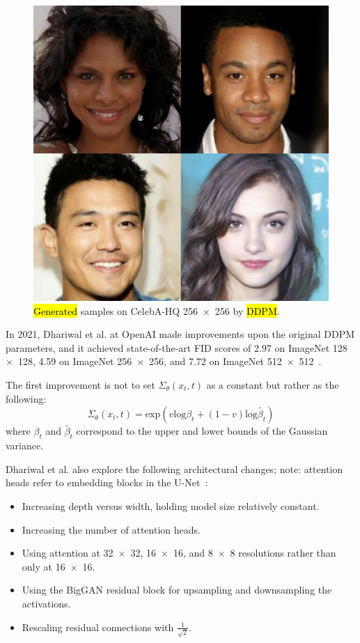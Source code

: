 \documentclass[technologies,article,accept,pdftex,moreauthors]{Definitions/mdpi}
\begin{document}
\begin{figure}[H]
    \includegraphics[width=.95\columnwidth]{celeb.png}
    \caption{\label{fig:DDPMCeleb}\hl{Generated} %
 samples on CelebA-HQ 256~$\times$~256 by \hl{DDPM}.}
\end{figure}



In 2021, Dhariwal et al. at OpenAI made improvements upon the original DDPM parameters, and it achieved state-of-the-art FID scores of 2.97 on ImageNet 128~$\times$~128, 4.59 on ImageNet 256~$\times$~256, and 7.72 on ImageNet 512~$\times$~512~\cite{dhariwal2021diffusion}.

The first improvement is not to set $\Sigma_\theta(x_t, t) $ as a constant but rather as the following:
\begin{equation}
\Sigma_\theta(x_t, t) = \mathrm{exp}(v \mathrm{log} \beta_t + (1 - v) \mathrm{log} \tilde{\beta_t})
\end{equation}
where $\beta_t$ and  $\tilde{\beta_t}$ correspond to the upper and lower bounds of the Gaussian variance.


Dhariwal et al. also explore the following architectural changes; note: attention heads refer to embedding blocks in the U-Net~\cite{dhariwal2021diffusion}:
\begin{itemize}
\item Increasing depth versus width, holding model size relatively constant.
\item Increasing the number of attention heads.
\item Using attention at 32~$\times$~32, 16~$\times$~16, and 8~$\times$~8 resolutions rather than only at 16~$\times$~16.
\item Using the BigGAN residual block for upsampling and downsampling the activations.
\item Rescaling residual connections with $\frac{1}{\sqrt{2}}$.
\end{itemize}
\end{document}
